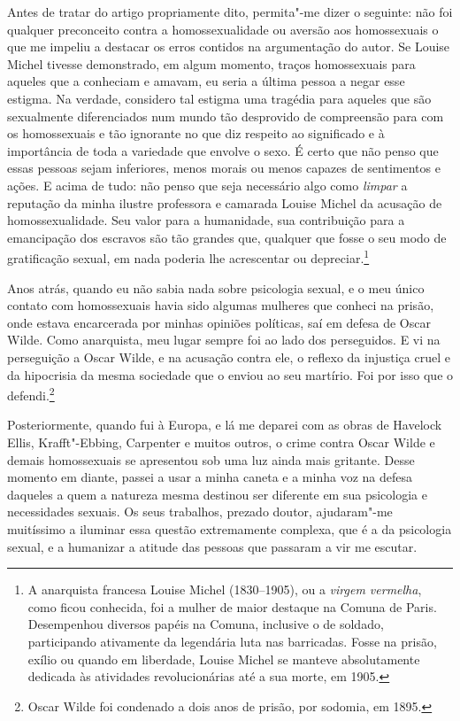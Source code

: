 Antes de tratar do artigo propriamente dito, permita"-me dizer o
seguinte: não foi qualquer preconceito contra a homossexualidade ou
aversão aos homossexuais o que me impeliu a destacar os erros contidos
na argumentação do autor. Se Louise Michel tivesse demonstrado, em algum
momento, traços homossexuais para aqueles que a conheciam e amavam, eu
seria a última pessoa a negar esse estigma. Na verdade, considero tal
estigma uma tragédia para aqueles que são sexualmente diferenciados num
mundo tão desprovido de compreensão para com os homossexuais e tão
ignorante no que diz respeito ao significado e à importância de toda a
variedade que envolve o sexo. É certo que não penso que essas pessoas
sejam inferiores, menos morais ou menos capazes de sentimentos e ações.
E acima de tudo: não penso que seja necessário algo como \textit{limpar} a reputação da minha
ilustre professora e camarada Louise Michel da acusação de
homossexualidade. Seu valor para a humanidade, sua contribuição para a
emancipação dos escravos são tão grandes que, qualquer que fosse o seu
modo de gratificação sexual, em nada poderia lhe acrescentar ou
depreciar.\footnote{A anarquista francesa Louise Michel (1830--1905), ou
  a \textit{virgem vermelha}, como ficou conhecida, foi a mulher de maior
  destaque na Comuna de Paris. Desempenhou diversos papéis na Comuna,
  inclusive o de soldado, participando ativamente da legendária luta nas
  barricadas. Fosse na prisão, exílio ou quando em liberdade, Louise
  Michel se manteve absolutamente dedicada às atividades revolucionárias
  até a sua morte, em 1905.}

Anos atrás, quando eu não sabia nada sobre psicologia sexual, e o meu
único contato com homossexuais havia sido algumas mulheres que conheci
na prisão, onde estava encarcerada por minhas opiniões políticas, saí em
defesa de Oscar Wilde. Como anarquista, meu lugar sempre foi ao lado dos
perseguidos. E vi na perseguição a Oscar Wilde, e na acusação contra ele,
o reflexo da injustiça cruel e da hipocrisia da mesma sociedade que o
enviou ao seu martírio. Foi por isso que o defendi.\footnote{Oscar Wilde
  foi condenado a dois anos de prisão, por sodomia, em 1895.}

Posteriormente, quando fui à Europa, e lá me deparei com as obras de
Havelock Ellis, Krafft"-Ebbing, Carpenter e muitos outros, o crime contra
Oscar Wilde e demais homossexuais se apresentou sob uma luz ainda mais
gritante. Desse momento em diante, passei a usar a minha caneta e a
minha voz na defesa daqueles a quem a natureza mesma destinou ser
diferente em sua psicologia e necessidades sexuais. Os seus trabalhos,
prezado doutor, ajudaram"-me muitíssimo a iluminar essa questão
extremamente complexa, que é a da psicologia sexual, e a humanizar a
atitude das pessoas que passaram a vir me escutar.

